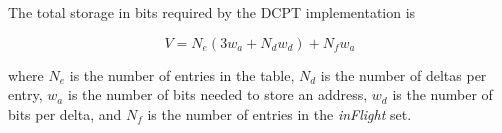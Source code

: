 The total storage in bits required by the DCPT implementation is

\begin{equation*}
V = N_e (3 w_a + N_d w_d) + N_f w_a
\end{equation*} 

where $N_e$ is the number of entries in the table, $N_d$ is the number of deltas
per entry, $w_a$ is the number of bits needed to store an address, $w_d$ is the
number of bits per delta, and $N_f$ is the number of entries in the \emph{inFlight}
set.
